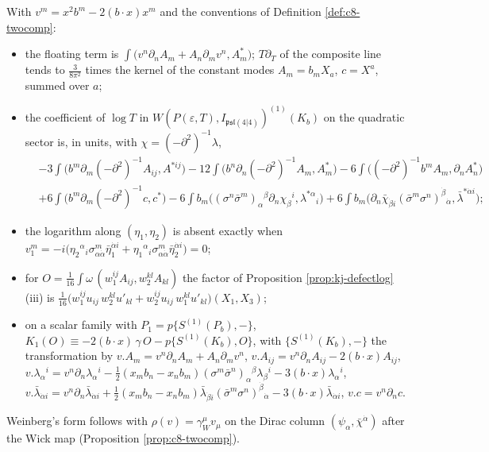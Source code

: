 \begin{proposition}
\label{prop:kj-twocomp}
With $v^m=x^2b^m-2(b\cdot x)x^m$ and the conventions of Definition \ref{def:c8-twocomp}:
\begin{itemize}
\item the floating term is $\int\big(v^n\partial_nA_m+A_n\partial_mv^n,A^*_m\big)$; $T\partial_T$ of the composite line tends to $\tfrac{3}{8\pi^2}$ times the kernel of the constant modes $A_m=b_mX_a$, $c=X^a$, summed over $a$;
\item the coefficient of $\log T$ in $W(P(\varepsilon,T),I_{\mathfrak{psl}(4|4)})^{(1)}(K_b)$ on the quadratic sector is, in units, with $\chi=(-\partial^2)^{-1}\lambda$,
\[
\begin{aligned}
&-3\int\big(b^m\partial_m(-\partial^2)^{-1}A_{ij},A^{*ij}\big)-12\int\big(b^n\partial_n(-\partial^2)^{-1}A_m,A^*_m\big)-6\int\big((-\partial^2)^{-1}b^mA_m,\partial_nA^*_n\big)\\
&+6\int\big(b^m\partial_m(-\partial^2)^{-1}c,c^*\big)-6\int b_m\big((\sigma^n\bar\sigma^m)_\alpha{}^\beta\partial_n\chi_\beta{}^i,\lambda^{*\alpha}{}_i\big)+6\int b_m\big(\partial_n\bar\chi_{\dot\beta i}(\bar\sigma^m\sigma^n)^{\dot\beta}{}_{\dot\alpha},\bar\lambda^{*\dot\alpha i}\big);
\end{aligned}
\]
\item the logarithm along $(\eta_1,\eta_2)$ is absent exactly when $v_1^m=-i\big(\eta_2{}^\alpha{}_i\sigma^m_{\alpha\dot\alpha}\bar\eta_1^{\dot\alpha i}+\eta_1{}^\alpha{}_i\sigma^m_{\alpha\dot\alpha}\bar\eta_2^{\dot\alpha i}\big)=0$;
\item for $O=\tfrac1{16}\int\omega\,(w_1^{ij}A_{ij},w_2^{kl}A_{kl})$ the factor of Proposition \ref{prop:kj-defectlog} (iii) is $\tfrac1{16}\big(w_1^{ij}u_{ij}\,w_2^{kl}u'_{kl}+w_2^{ij}u_{ij}\,w_1^{kl}u'_{kl}\big)(X_1,X_3)$;
\item on a scalar family with $P_1=p\{S^{(1)}(P_b),-\}$, $K_1(O)\equiv-2(b\cdot x)\,\gamma\,O-p\{S^{(1)}(K_b),O\}$, with $\{S^{(1)}(K_b),-\}$ the transformation by $v.A_m=v^n\partial_nA_m+A_n\partial_mv^n$, $v.A_{ij}=v^n\partial_nA_{ij}-2(b\cdot x)A_{ij}$, $v.\lambda_\alpha{}^i=v^n\partial_n\lambda_\alpha{}^i-\tfrac12(x_mb_n-x_nb_m)(\sigma^m\bar\sigma^n)_\alpha{}^\beta\lambda_\beta{}^i-3(b\cdot x)\lambda_\alpha{}^i$, $v.\bar\lambda_{\dot\alpha i}=v^n\partial_n\bar\lambda_{\dot\alpha i}+\tfrac12(x_mb_n-x_nb_m)\bar\lambda_{\dot\beta i}(\bar\sigma^m\sigma^n)^{\dot\beta}{}_{\dot\alpha}-3(b\cdot x)\bar\lambda_{\dot\alpha i}$, $v.c=v^n\partial_nc$.
\end{itemize}
Weinberg's form follows with $\rho(v)=\gamma_W^\mu v_\mu$ on the Dirac column $(\psi_\alpha,\bar\chi^{\dot\alpha})$ after the Wick map (Proposition \ref{prop:c8-twocomp}).
\end{proposition}


